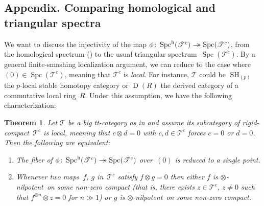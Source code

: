 \documentclass[JEP,XML,SOM,Unicode]{cedram}
\newenvironment{enumeratei}
{\bgroup\def\theenumi{\roman{enumi}}\begin{enumerate}}
{\end{enumerate}\egroup}
\newcommand{\onto}{\mathchoice{\to\hspace*{-5mm}\to}{\to\hspace*{-2.85mm}\to}{\to\hspace*{-3mm}\to}{\to\hspace*{-3mm}\to}}
\numberwithin{equation}{section}
\newtheorem{Thm}[equation]{Theorem}
\theoremstyle{definition}
\DeclareMathOperator{\Spc}{Spc}
\newcommand{\cat}[1]{\mathscr{#1}}
\DeclareMathOperator{\Der}{D}
\DeclareMathOperator{\SH}{SH}
\newcommand{\smallh}{\mathrm{h}}
\newcommand{\cT}{\cat{T}}
\newcommand{\potimes}[1]{^{\otimes #1}}
\newcommand{\SpchT}{\Spch(\cat{T}^c)}
\newcommand{\Spch}{\Spc^{\smallh}}
\newcommand{\SpcT}{\Spc(\cat{T}^c)}
\newcommand{\tensnil}{$\otimes$\nobreakdash-nilpotent}
\begin{document}
\begin{appendix}
\section*{Appendix. Comparing homological and triangular spectra}
\label{App:hom-local}

We want to discuss the injectivity of the map $\phi\colon \SpchT\onto \SpcT$, from the homological spectrum () to the usual triangular spectrum~$\SpcT$. By a general finite-smashing localization argument, we can reduce to the case where $(0)\in \SpcT$, meaning that $\cT^c$ is \emph{local}. For instance, $\cT$ could be $\SH_{(p)}$ the $p$-local stable homotopy category or $\Der(R)$ the derived category of a commutative local ring~$R$. Under this assumption, we have the following characterization:

\begin{Thm}
\label{Thm:hom-local}
Let $\cT$ be a big tt-category as in  and assume its subcategory of rigid-compact~$\cT^c$ is \emph{local}, meaning that $c\otimes d=0$ with $c,d\in\cT^c$ forces $c=0$ or $d=0$. Then the following are equivalent:
\begin{enumeratei}
\item
\label{it:fiber=*}
The fiber of $\phi\colon \SpchT\onto \SpcT$ over~$(0)$ is reduced to a single point.

\item
\label{it:hom-local}
Whenever two maps~$f$, $g$ in~$\cT^c$ satisfy $f\otimes g=0$ then either $f$ is \tensnil\ on some non-zero compact (that is, there exists $z\in\cT^c$, $z\neq0$ such that $f\potimes{n}\otimes z=0$ for $n\gg1$) or $g$ is \tensnil\ on some non-zero compact.
\end{enumeratei}
\end{Thm}


\end{appendix}
\end{document}
